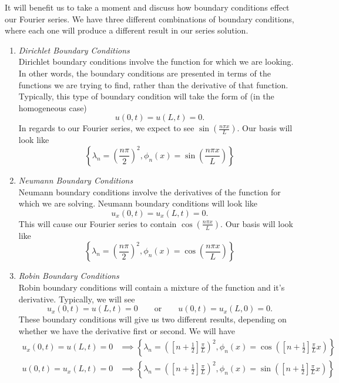 \indent It will benefit us to take a moment and discuss how boundary conditions
effect our Fourier series. We have three different combinations of boundary
conditions, where each one will produce a different result in our series solution.
\begin{enumerate}
\item \textit{Dirichlet Boundary Conditions}\\
Dirichlet boundary conditions involve the function for which we are looking. In
other words, the boundary conditions are presented in terms of the functions we
are trying to find, rather than the derivative of that function. Typically, this
type of boundary condition will take the form of (in the homogeneous case)
\[u(0,t) = u(L,t) = 0.\]
In regards to our Fourier series, we expect to see $\sin{(\frac{n\pi x}{L})}$.
Our basis will look like
\[
\left\{ \lambda_{n} = \left(\frac{n\pi}{2}\right)^{2}, \phi_{n}(x) = \sin{\left(\frac{n\pi x}{L}\right)}
\right\}
\]
\item \textit{Neumann Boundary Conditions}\\
Neumann boundary conditions involve the derivatives of the function for which we
are solving. Neumann boundary conditions will look like
\[u_{x}(0,t) = u_{x}(L,t) = 0.\]
This will cause our Fourier series to contain $\cos{(\frac{n\pi x}{L})}$. Our
basis will look like
\[
\left\{ \lambda_{n} = \left(\frac{n\pi}{2}\right)^{2}, \phi_{n}(x) = \cos{\left(\frac{n\pi x}{L}\right)}
\right\}
\]
\item \textit{Robin Boundary Conditions}\\
Robin boundary conditions will contain a mixture of the function and it's
derivative. Typically, we will see
\[ u_{x}(0,t) = u(L,t) = 0\qquad \text{or}\qquad u(0,t) = u_{x}(L,0) = 0.\]
These boundary conditions will give us two different results, depending on whether
we have the derivative first or second. We will have
\begin{align*}
u_{x}(0,t) = u(L,t) = 0 &\implies \left\{\lambda_{n} = \left(\left[n +
\frac{1}{2}\right]\frac{\pi}{L}\right)^{2}, \phi_{n}(x) = \cos{\left(\left[n +
\frac{1}{2}\right]\frac{\pi}{L}x\right)}\right\}\\
u(0,t) = u_{x}(L,t) = 0 &\implies \left\{\lambda_{n} = \left(\left[n +
\frac{1}{2}\right]\frac{\pi}{L}\right)^{2}, \phi_{n}(x) =\sin{\left(\left[n +
\frac{1}{2}\right]\frac{\pi}{L}x\right)}\right\}
\end{align*}
\end{enumerate}

